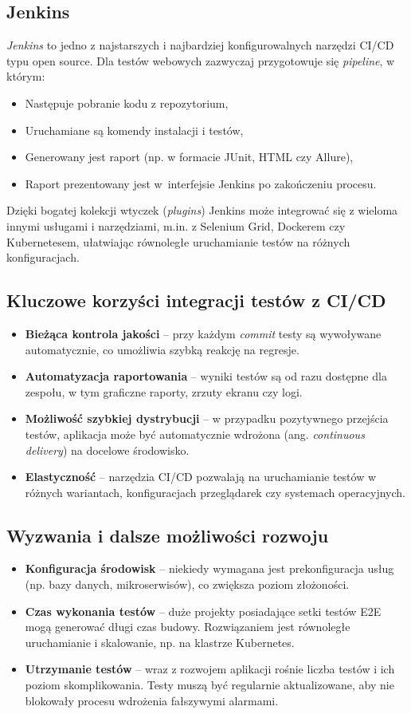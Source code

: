 \documentclass[12pt]{report}
\begin{document}
\subsection*{Jenkins}
\emph{Jenkins} to jedno z najstarszych i najbardziej konfigurowalnych narzędzi CI/CD typu open source. Dla testów webowych zazwyczaj przygotowuje się \emph{pipeline}, w którym:
\begin{itemize}
    \item Następuje pobranie kodu z repozytorium,
    \item Uruchamiane są komendy instalacji i testów,
    \item Generowany jest raport (np. w formacie JUnit, HTML czy Allure),
    \item Raport prezentowany jest w~interfejsie Jenkins po zakończeniu procesu.
\end{itemize}
Dzięki bogatej kolekcji wtyczek (\emph{plugins}) Jenkins może integrować się z wieloma innymi usługami i narzędziami, m.in. z Selenium Grid, Dockerem czy Kubernetesem, ułatwiając równoległe uruchamianie testów na różnych konfiguracjach.

\subsection*{Kluczowe korzyści integracji testów z CI/CD}
\begin{itemize}
    \item \textbf{Bieżąca kontrola jakości} – przy każdym \emph{commit} testy są wywoływane automatycznie, co umożliwia szybką reakcję na regresje.
    \item \textbf{Automatyzacja raportowania} – wyniki testów są od razu dostępne dla zespołu, w tym graficzne raporty, zrzuty ekranu czy logi.
    \item \textbf{Możliwość szybkiej dystrybucji} – w przypadku pozytywnego przejścia testów, aplikacja może być automatycznie wdrożona (ang. \emph{continuous delivery}) na docelowe środowisko.
    \item \textbf{Elastyczność} – narzędzia CI/CD pozwalają na uruchamianie testów w różnych wariantach, konfiguracjach przeglądarek czy systemach operacyjnych.
\end{itemize}

\subsection*{Wyzwania i dalsze możliwości rozwoju}
\begin{itemize}
    \item \textbf{Konfiguracja środowisk} – niekiedy wymagana jest prekonfiguracja usług (np. bazy danych, mikroserwisów), co zwiększa poziom złożoności.
    \item \textbf{Czas wykonania testów} – duże projekty posiadające setki testów E2E mogą generować długi czas budowy. Rozwiązaniem jest równoległe uruchamianie i skalowanie, np. na klastrze Kubernetes.
    \item \textbf{Utrzymanie testów} – wraz z rozwojem aplikacji rośnie liczba testów i ich poziom skomplikowania. Testy muszą być regularnie aktualizowane, aby nie blokowały procesu wdrożenia fałszywymi alarmami.
\end{itemize}
\end{document}
